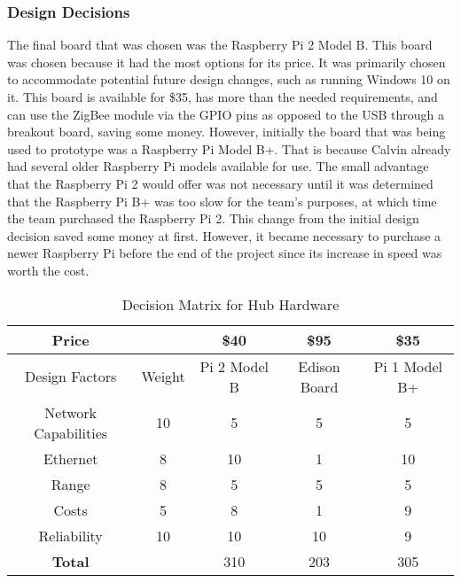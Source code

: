 \documentclass[PPFS.tex]{template/subfiles}
\begin{document}
\subsubsection{Design Decisions}
The final board that was chosen was the Raspberry Pi 2 Model B. This board was chosen because it had the most options for its price. It was primarily chosen to accommodate potential future design changes, such as running Windows 10 on it. This board is available for \$35, has more than the needed requirements, and can use the ZigBee module via the GPIO pins as opposed to the USB through a breakout board, saving some money. However, initially the board that was being used to prototype was a Raspberry Pi Model B+. That is because Calvin already had several older Raspberry Pi models available for use. The small advantage that the Raspberry Pi 2 would offer was not necessary until it was determined that the Raspberry Pi B+ was too slow for the team's purposes, at which time the team purchased the Raspberry Pi 2. This change from the initial design decision saved some money at first. However, it became necessary to purchase a newer Raspberry Pi before the end of the project since its increase in speed was worth the cost.

       \begin{table}[h!]
       	\begin{center}
       		\caption{Decision Matrix for Hub Hardware}
       		\label{tab:hubMatrix}
       		\begin{tabular}{|c|c|c|c|c|}
       			\hline
       			Price && \$40 & \$95 & \$35 \\
       			\hline
       			Design Factors & Weight & Pi 2 Model B & Edison Board & Pi 1 Model B+ \\
       			\hline
       			Network Capabilities & 10 & 5 & 5 & 5\\
       			\hline
       			Ethernet & 8 & 10 & 1 & 10 \\
       			\hline
       			Range & 8 & 5 & 5 & 5 \\
       			\hline
       			Costs & 5 & 8 & 1 & 9 \\
       			\hline
       			Reliability & 10 & 10 & 10 & 9 \\
       			\hline
       			\textbf{Total} && 310 & 203 & 305 \\
       			\hline
       		\end{tabular}
       	\end{center}
       \end{table}
\end{document}
